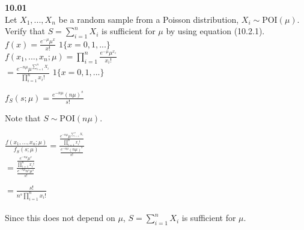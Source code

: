 \textbf{10.01} \\
Let $X_1,...,X _{n} $ be a random sample from a Poisson distribution, $X _{i} \sim $POI$(\mu)$. Verify that $S = \sum\limits_{i=1}^n X_{i}$ is sufficient for $\mu$ by using equation (10.2.1).\\

\hspace{0.5in}
$f(x) = \frac{e^{-\mu}\mu^x}{x!}$
\hspace{1.6in}
$1\{x = 0,1,...\}$\\

\vspace{0.15in}
\hspace{0.5in}
$f(x_{1},...,x_{n};\mu) = \prod\limits_{i=1}^n \frac{e^{-\mu}\mu^{x_{i}}}{x_{i}!}$\\

\hspace{1.5in}
$=\frac{e^{-n\mu}\mu^{\sum\limits_{i=1}^n X_{i}}}{\prod\limits_{i=1}^n x_{i}!}$
\hspace{0.63in}
$1\{x = 0,1,...\}$\\
\vspace{0.25in}

\hspace{0.5in}
$f_{S}(s;\mu) = \frac{e^{-n\mu}(n\mu)^s}{s!}$
\hspace{0.63in}\\
\vspace{0.1in}

Note that $S \sim $POI$(n\mu)$.
\hspace{0.63in}\\
\vspace{0.1in}

\hspace{0.5in}
$\frac{f(x_{1},...,x_{n};\mu)}{f_{S}(s;\mu)} = \frac{ \frac{e^{-n\mu}\mu^{\sum\limits_{i=1}^n X_{i}}}{\prod\limits_{i=1}^n x_{i}!}}  {\frac{e^{-n\mu}(n\mu)^s}{s!}}$
\hspace{0.63in}\\

\vspace{0.1in}
\hspace{1.25in}
$= \frac{ \frac{e^{-n\mu}\mu^s}{\prod\limits_{i=1}^n x_{i}!}}  {\frac{e^{-n\mu}n^s\mu^s}{s!}}$
\hspace{0.63in}

\vspace{0.1in}
\hspace{1.25in}
$= \frac{s!}{n^s\prod\limits_{i=1}^n x_{i}!}$
\hspace{0.63in}\\
\vspace{0.1in}
\vspace{0.1in}\\
Since this does not depend on $\mu$, $S = \sum\limits_{i=1}^n X_{i}$ is sufficient for $\mu$.
